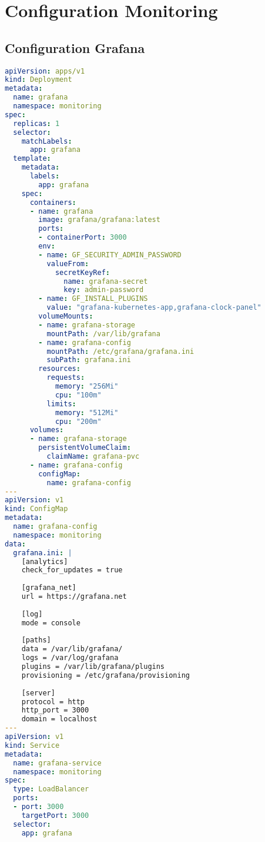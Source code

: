 \section{Configuration Monitoring}

\subsection{Configuration Grafana}

\begin{lstlisting}[language=YAML, caption=monitoring/grafana-deployment.yaml]
apiVersion: apps/v1
kind: Deployment
metadata:
  name: grafana
  namespace: monitoring
spec:
  replicas: 1
  selector:
    matchLabels:
      app: grafana
  template:
    metadata:
      labels:
        app: grafana
    spec:
      containers:
      - name: grafana
        image: grafana/grafana:latest
        ports:
        - containerPort: 3000
        env:
        - name: GF_SECURITY_ADMIN_PASSWORD
          valueFrom:
            secretKeyRef:
              name: grafana-secret
              key: admin-password
        - name: GF_INSTALL_PLUGINS
          value: "grafana-kubernetes-app,grafana-clock-panel"
        volumeMounts:
        - name: grafana-storage
          mountPath: /var/lib/grafana
        - name: grafana-config
          mountPath: /etc/grafana/grafana.ini
          subPath: grafana.ini
        resources:
          requests:
            memory: "256Mi"
            cpu: "100m"
          limits:
            memory: "512Mi"
            cpu: "200m"
      volumes:
      - name: grafana-storage
        persistentVolumeClaim:
          claimName: grafana-pvc
      - name: grafana-config
        configMap:
          name: grafana-config
---
apiVersion: v1
kind: ConfigMap
metadata:
  name: grafana-config
  namespace: monitoring
data:
  grafana.ini: |
    [analytics]
    check_for_updates = true
    
    [grafana_net]
    url = https://grafana.net
    
    [log]
    mode = console
    
    [paths]
    data = /var/lib/grafana/
    logs = /var/log/grafana
    plugins = /var/lib/grafana/plugins
    provisioning = /etc/grafana/provisioning
    
    [server]
    protocol = http
    http_port = 3000
    domain = localhost
---
apiVersion: v1
kind: Service
metadata:
  name: grafana-service
  namespace: monitoring
spec:
  type: LoadBalancer
  ports:
  - port: 3000
    targetPort: 3000
  selector:
    app: grafana
\end{lstlisting}

